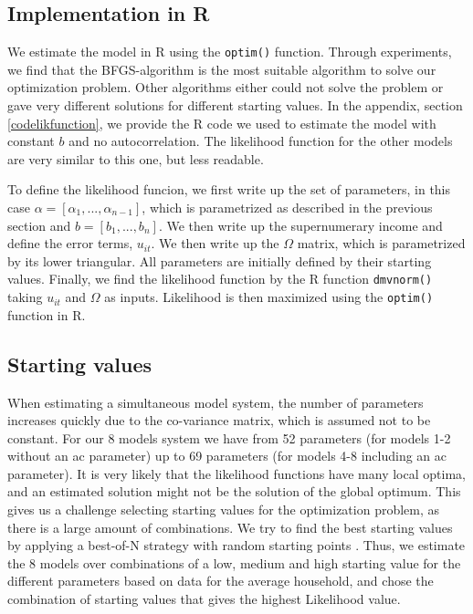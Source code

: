 \subsection{Implementation in R}
We estimate the model in R using the \texttt{optim()} function. Through experiments, we find that the BFGS-algorithm is the most suitable algorithm to solve our optimization problem. Other algorithms either could not solve the problem or gave very different solutions for different starting values. In the appendix, section \ref{codelikfunction}, we provide the R code we used to estimate the model with constant $b$ and no autocorrelation. The likelihood function for the other models are very similar to this one, but less readable.

To define the likelihood funcion, we first write up the set of parameters, in this case $\alpha = [\alpha_1,...,\alpha_{n-1}]$, which is parametrized as described in the previous section and $b = [b_1,...,b_n]$. We then write up the supernumerary income and define the error terms, $u_{it}$. We then write up the $\Omega$ matrix, which is parametrized by its lower triangular. All parameters are initially defined by their starting values. Finally, we find the likelihood function by the R function \texttt{dmvnorm()} taking $u_{it}$ and $\Omega$ as inputs. Likelihood is then maximized using the \texttt{optim()} function in R.

\subsection{Starting values}
When estimating a simultaneous model system, the number of parameters increases quickly due to the co-variance matrix, which is assumed not to be constant. For our 8 models system we have from 52 parameters (for models 1-2 without an ac parameter) up to 69 parameters (for models 4-8 including an ac parameter). It is very likely that the likelihood functions have many local optima, and an estimated solution might not be the solution of the global optimum. This gives us a challenge selecting starting values for the optimization problem, as there is a large amount of combinations. We try to find the best starting values by applying a best-of-N strategy with random starting points \citep{startingvalues}. Thus, we estimate the 8 models over combinations of a low, medium and high starting value for the different parameters based on data for the average household, and chose the combination of starting values that gives the highest Likelihood value.

